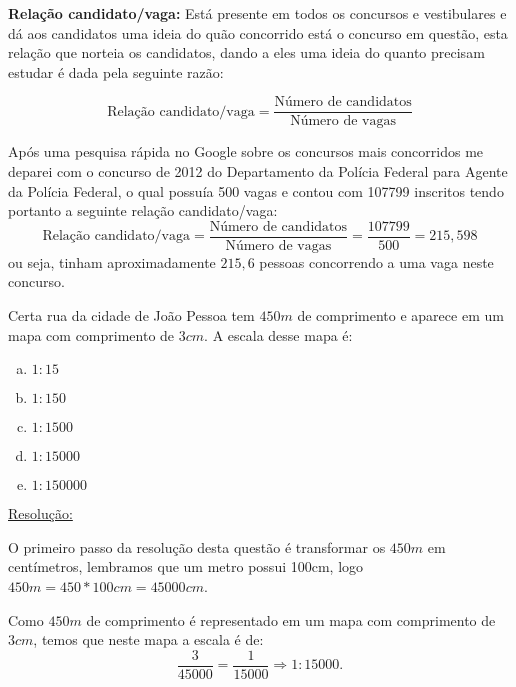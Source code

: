\textbf{Relação candidato/vaga:} Está presente em todos os concursos e vestibulares e dá aos candidatos uma ideia do quão concorrido está o concurso em questão, esta relação que norteia os candidatos, dando a eles uma ideia do quanto precisam estudar é dada pela seguinte razão:

\begin{equation}
\text{Relação candidato/vaga}= \frac{\text{Número de candidatos}}{\text{Número de vagas}}
\end{equation}

\begin{exem}
 Após uma pesquisa rápida no Google sobre os concursos mais concorridos me deparei com o concurso de 2012 do Departamento da Polícia Federal para Agente da Polícia Federal, o qual possuía 500 vagas e contou com 107799 inscritos tendo portanto a seguinte relação candidato/vaga:
\begin{equation}
\text{Relação candidato/vaga}= \frac{\text{Número de candidatos}}{\text{Número de vagas}}= \frac{107799}{500}= 215,598
\end{equation}
 ou seja, tinham aproximadamente $215,6$ pessoas concorrendo a uma vaga neste concurso.

 \fim
\end{exem}


\begin{exem}[FGV - 2014]
Certa rua da cidade de João Pessoa tem $450 m$ de comprimento e aparece em um mapa com comprimento de $3 cm$. A escala desse mapa é:
\begin{multicols}{5}
\begin{enumerate}[a)]
 \item $1:15$
 \item $1:150$
 \item $1:1500$
 \item $1:15000$
 \item $1:150000$
\end{enumerate}
\end{multicols}
\underline{Resolução:}

O primeiro passo da resolução desta questão é transformar os $450m$ em centímetros, lembramos que um metro possui 100cm, logo $450 m=450*100 cm= 45000 cm$.

Como $450 m$ de comprimento é representado em um mapa com comprimento de $3 cm$, temos que neste mapa a escala é de:
\begin{equation}
\frac{3}{45000}= \frac{1}{15000} \Rightarrow 1:15000 .
\end{equation}

 \fim
\end{exem}


